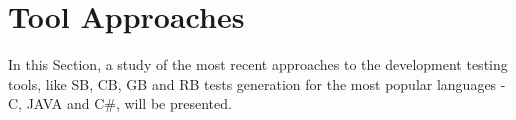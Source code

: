 
\section{Tool Approaches}\label{testingapproaches}
In this Section, a study of the most recent approaches to the development testing tools,
like \ac{SB}, \ac{CB}, \ac{GB} and \ac{RB} tests generation
for the most popular languages - C, JAVA and C\#, will be presented.

